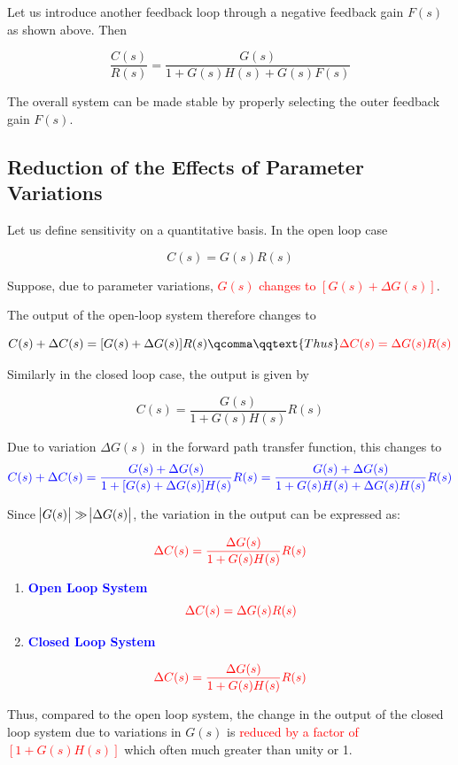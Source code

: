 \documentclass[
  14pt,
  a4paper,
  oneside,
  open=any,
  a4paper,
  14pt]{report}
\begin{document}
Let us introduce another feedback loop through a negative feedback gain
\(F(s)\) as shown above. Then

\[
    \dfrac{C(s)}{R(s)} = \dfrac{G(s)}{1+G(s)H(s) + G(s)F(s)}
\]

The overall system can be made stable by properly selecting the outer
feedback gain \(F(s)\).

\subsection{Reduction of the Effects of Parameter
Variations}\label{reduction-of-the-effects-of-parameter-variations}

Let us define sensitivity on a quantitative basis. In the open loop case

\[
    C(s) = G(s)R(s)
\]

Suppose, due to parameter variations, \textcolor{red}{\(G(s)\) changes
to \([G(s) + \Delta G(s)]\)}.

The output of the open-loop system therefore changes to

\[
    C(s) + \Delta C(s) = [G(s) + \Delta G(s)]R(s)\qcomma \qqtext{Thus} \textcolor{red}{\Delta C(s) = \Delta G(s)R(s)}
\]

Similarly in the closed loop case, the output is given by

\[
    C(s) = \dfrac{G(s)}{1+G(s)H(s)}R(s)
\]

Due to variation \(\Delta G(s)\) in the forward path transfer function,
this changes to \[
    \textcolor{blue}{C(s) + \Delta C(s) = \dfrac{G(s) + \Delta G(s)}{1+[G(s) + \Delta G(s)]H(s)}R(s) = \dfrac{G(s) + \Delta G(s)}{1+G(s)H(s)+\Delta G(s)H(s)}R(s)}
\]

Since \(\abs{G(s)} \gg \abs{\Delta G(s)}\), the variation in the output
can be expressed as:

\[
    \textcolor{red}{\Delta C(s) = \dfrac{\Delta G(s)}{1+G(s)H(s)}R(s)}
\]

\begin{enumerate}
\def\labelenumi{\arabic{enumi}.}
\item
  \textcolor{blue}{\textbf{Open Loop System}} \[
   \textcolor{red}{\Delta C(s) = \Delta G(s)R(s)}
  \]
\item
  \textcolor{blue}{\textbf{Closed Loop System}}
\end{enumerate}

\[
    \textcolor{red}{\Delta C(s) = \dfrac{\Delta G(s)}{1+G(s)H(s)}R(s)}
\]

Thus, compared to the open loop system, the change in the output of the
closed loop system due to variations in \(G(s)\) is
\textcolor{red}{reduced by a factor of \([1+G(s)H(s)]\)} which often
much greater than unity or 1.
\end{document}
